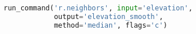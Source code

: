 \documentclass{standalone}
\begin{document}
\begin{lstlisting}[language=Python,linewidth=34.2em]
run_command('r.neighbors', input='elevation',
            output='elevation_smooth',
            method='median', flags='c')
\end{lstlisting}
\end{document}
